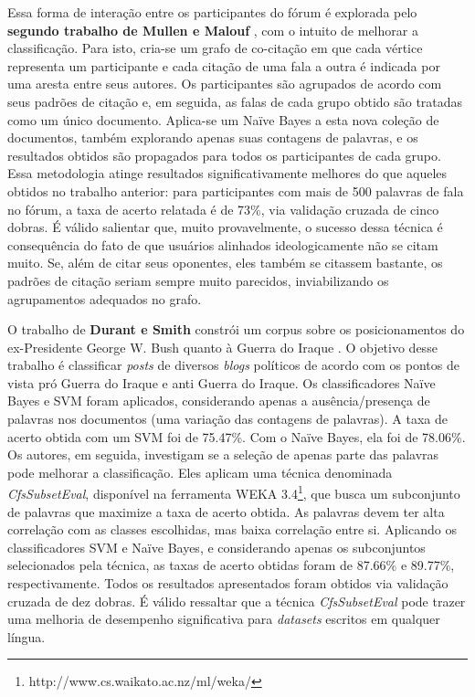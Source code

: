 Essa forma de interação entre os participantes do fórum é explorada pelo \textbf{segundo trabalho de Mullen e Malouf} \cite{malouf-taking_sides}, com o intuito de melhorar a classificação. Para isto, cria-se um grafo de co-citação em que cada vértice representa um participante e cada citação de uma fala a outra é indicada por uma aresta entre seus autores. Os participantes são agrupados de acordo com seus padrões de citação e, em seguida, as falas de cada grupo obtido são tratadas como um único documento. Aplica-se um Naïve Bayes a esta nova coleção de documentos, também explorando apenas suas contagens de palavras, e os resultados obtidos são propagados para todos os participantes de cada grupo. Essa metodologia atinge resultados significativamente melhores do que aqueles obtidos no trabalho anterior: para participantes com mais de 500 palavras de fala no fórum, a taxa de acerto relatada é de 73\%, via validação cruzada de cinco dobras. É válido salientar que, muito provavelmente, o sucesso dessa técnica é consequência do fato de que usuários alinhados ideologicamente não se citam muito. Se, além de citar seus oponentes, eles também se citassem bastante, os padrões de citação seriam sempre muito parecidos, inviabilizando os agrupamentos adequados no grafo.

O trabalho de \textbf{Durant e Smith} constrói um corpus sobre os posicionamentos do ex-Presidente George W. Bush quanto à Guerra do Iraque \cite{durant-smith}. O objetivo desse trabalho é classificar \emph{posts} de diversos \emph{blogs} políticos de acordo com os pontos de vista pró Guerra do Iraque e anti Guerra do Iraque.  Os classificadores Naïve Bayes e SVM foram aplicados, considerando apenas a ausência/presença de palavras nos documentos (uma variação das contagens de palavras). A taxa de acerto obtida com um SVM foi de 75.47\%. Com o Naïve Bayes, ela foi de 78.06\%. Os autores, em seguida, investigam se a seleção de apenas parte das palavras pode melhorar a classificação. Eles aplicam uma técnica denominada \emph{CfsSubsetEval}, disponível na ferramenta WEKA 3.4\footnote{http://www.cs.waikato.ac.nz/ml/weka/}, que busca um subconjunto de palavras que maximize a taxa de acerto obtida. As palavras devem ter alta correlação com as classes escolhidas, mas baixa correlação entre si. Aplicando os classificadores SVM e Naïve Bayes, e considerando apenas os subconjuntos selecionados pela técnica, as taxas de acerto obtidas foram de 87.66\% e 89.77\%, respectivamente. Todos os resultados apresentados foram obtidos via validação cruzada de dez dobras. É válido ressaltar que a técnica \emph{CfsSubsetEval} pode trazer uma melhoria de desempenho significativa para \emph{datasets} escritos em qualquer língua.

